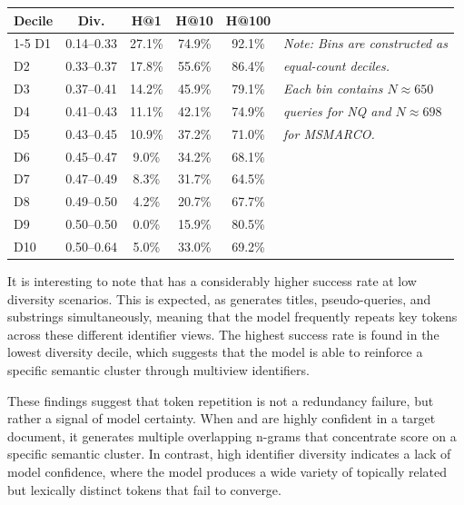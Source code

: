 \begin{table}[H]
{\begin{tabular}{l | c ccc | c ccc}
        \textbf{Decile} & \textbf{Div.} & \textbf{H@1} & \textbf{H@10} & \textbf{H@100} & & & & \\
        \cmidrule{1-5}
        D1  & 0.14–0.33 & 27.1\% & 74.9\% & 92.1\% & \multicolumn{4}{l}{\textit{Note: Bins are constructed as}} \\
        D2  & 0.33–0.37 & 17.8\% & 55.6\% & 86.4\% & \multicolumn{4}{l}{\textit{equal-count deciles.}} \\
        D3  & 0.37–0.41 & 14.2\% & 45.9\% & 79.1\% & \multicolumn{4}{l}{\textit{Each bin contains $N \approx 650$}} \\
        D4  & 0.41–0.43 & 11.1\% & 42.1\% & 74.9\% & \multicolumn{4}{l}{\textit{queries for NQ and $N \approx 698$}} \\
        D5  & 0.43–0.45 & 10.9\% & 37.2\% & 71.0\% & \multicolumn{4}{l}{\textit{for MSMARCO.}} \\
        D6  & 0.45–0.47 & 9.0\%  & 34.2\% & 68.1\% & \multicolumn{4}{l}{} \\
        D7  & 0.47–0.49 & 8.3\%  & 31.7\% & 64.5\% & \multicolumn{4}{l}{} \\
        D8  & 0.49–0.50 & 4.2\%  & 20.7\% & 67.7\% & \multicolumn{4}{l}{} \\
        D9  & 0.50–0.50 & 0.0\%  & 15.9\% & 80.5\% & \multicolumn{4}{l}{} \\
        D10 & 0.50–0.64 & 5.0\%  & 33.0\% & 69.2\% & \multicolumn{4}{l}{} \\
        \bottomrule
    \end{tabular}}
\end{table}

It is interesting to note that  has a considerably higher success rate at low diversity scenarios. This is expected, as  generates titles, pseudo-queries, and substrings simultaneously, meaning that the model frequently repeats key tokens across these different identifier views. The highest success rate is found in the lowest diversity decile, which suggests that the model is able to reinforce a specific semantic cluster through multiview identifiers.

These findings suggest that token repetition is not a redundancy failure, but rather a signal of model certainty. When  and  are highly confident in a target document, it generates multiple overlapping n-grams that concentrate score on a specific semantic cluster. In contrast, high identifier diversity indicates a lack of model confidence, where the model produces a wide variety of topically related but lexically distinct tokens that fail to converge.

